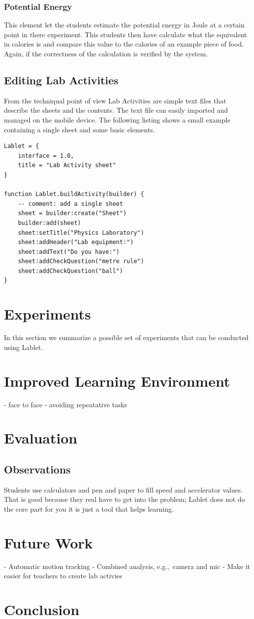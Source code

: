 \documentclass{sigchi}
\newcommand{\eg}{e.g.,\ }
\begin{document}
\subsubsection*{Potential Energy}
This element let the students estimate the potential energy in Joule
at a certain point in there experiment.  This students then have
calculate what the equivalent in calories is and compare this value to
the calories of an example piece of food.  Again, if the correctness
of the calculation is verified by the system.

\subsection{Editing Lab Activities}
From the techniqual point of view Lab Activities are simple text files
that describe the sheets and the contents.  The text file can easily
imported and managed on the mobile device.  The following listing
shows a small example containing a single sheet and some basic
elements.

\begin{lstlisting}
Lablet = {
    interface = 1.0,
    title = "Lab Activity sheet"
}
 
function Lablet.buildActivity(builder) {
    -- comment: add a single sheet
    sheet = builder:create("Sheet")
    builder:add(sheet)
    sheet:setTitle("Physics Laboratory")
    sheet:addHeader("Lab equipment:")
    sheet:addText("Do you have:")
    sheet:addCheckQuestion("metre rule")
    sheet:addCheckQuestion("ball")
}
\end{lstlisting}


\section{Experiments}
In this section we summarize a possible set of experiments that can be
conducted using Lablet.

\section{Improved Learning Environment}
- face to face 
- avoiding repeatative tasks

\section{Evaluation}

\subsection{Observations}
Students use calculators and pen and paper to fill speed and
accelerator values.  That is good because they real have to get into
the problem; Lablet does not do the core part for you it is just a
tool that helps learning.

\section{Future Work}
- Automatic motion tracking
- Combined analysis, \eg camera and mic
- Make it easier for teachers to create lab activies

\section{Conclusion}



\end{document}
